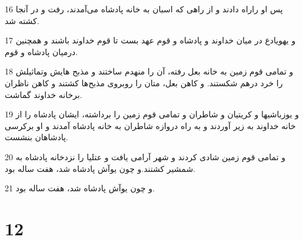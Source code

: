 \par 16 پس او راراه دادند و از راهی که اسبان به خانه پادشاه می‌آمدند، رفت و در آنجا کشته شد.
\par 17 و یهویادع در میان خداوند و پادشاه و قوم عهد بست تا قوم خداوند باشند و همچنین درمیان پادشاه و قوم.
\par 18 و تمامی قوم زمین به خانه بعل رفته، آن را منهدم ساختند و مذبح هایش وتماثیلش را خرد درهم شکستند. و کاهن بعل، متان را روبروی مذبح‌ها کشتند و کاهن ناظران برخانه خداوند گماشت.
\par 19 و یوزباشیها و کریتیان و شاطران و تمامی قوم زمین را برداشته، ایشان پادشاه را از خانه خداوند به زیر آوردند و به راه دروازه شاطران به خانه پادشاه آمدند و او برکرسی پادشاهان بنشست.
\par 20 و تمامی قوم زمین شادی کردند و شهر آرامی یافت و عتلیا را نزدخانه پادشاه به شمشیر کشتند.و چون یوآش پادشاه شد، هفت ساله بود.
\par 21 و چون یوآش پادشاه شد، هفت ساله بود.
 
\chapter{12}

